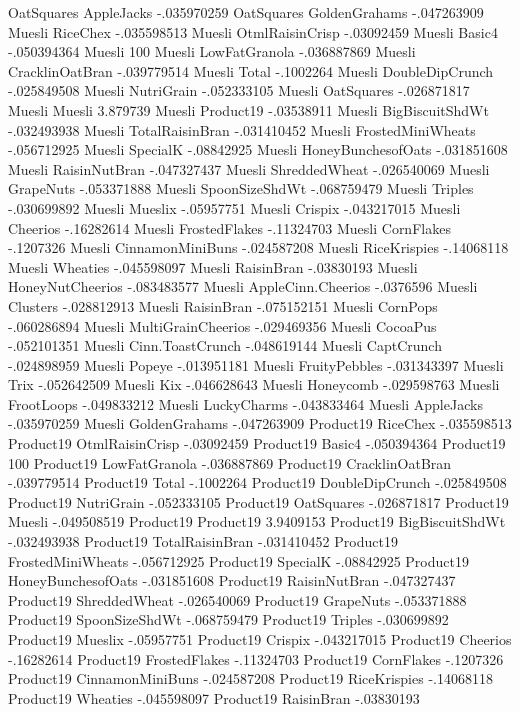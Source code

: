 OatSquares	AppleJacks	-.035970259
OatSquares	GoldenGrahams	-.047263909
Muesli	RiceChex	-.035598513
Muesli	OtmlRaisinCrisp	-.03092459
Muesli	Basic4	-.050394364
Muesli	100%
Muesli	LowFatGranola	-.036887869
Muesli	CracklinOatBran	-.039779514
Muesli	Total	-.1002264
Muesli	DoubleDipCrunch	-.025849508
Muesli	NutriGrain	-.052333105
Muesli	OatSquares	-.026871817
Muesli	Muesli	3.879739
Muesli	Product19	-.03538911
Muesli	BigBiscuitShdWt	-.032493938
Muesli	TotalRaisinBran	-.031410452
Muesli	FrostedMiniWheats	-.056712925
Muesli	SpecialK	-.08842925
Muesli	HoneyBunchesofOats	-.031851608
Muesli	RaisinNutBran	-.047327437
Muesli	ShreddedWheat	-.026540069
Muesli	GrapeNuts	-.053371888
Muesli	SpoonSizeShdWt	-.068759479
Muesli	Triples	-.030699892
Muesli	Mueslix	-.05957751
Muesli	Crispix	-.043217015
Muesli	Cheerios	-.16282614
Muesli	FrostedFlakes	-.11324703
Muesli	CornFlakes	-.1207326
Muesli	CinnamonMiniBuns	-.024587208
Muesli	RiceKrispies	-.14068118
Muesli	Wheaties	-.045598097
Muesli	RaisinBran	-.03830193
Muesli	HoneyNutCheerios	-.083483577
Muesli	AppleCinn.Cheerios	-.0376596
Muesli	Clusters	-.028812913
Muesli	RaisinBran	-.075152151
Muesli	CornPops	-.060286894
Muesli	MultiGrainCheerios	-.029469356
Muesli	CocoaPus	-.052101351
Muesli	Cinn.ToastCrunch	-.048619144
Muesli	CaptCrunch	-.024898959
Muesli	Popeye	-.013951181
Muesli	FruityPebbles	-.031343397
Muesli	Trix	-.052642509
Muesli	Kix	-.046628643
Muesli	Honeycomb	-.029598763
Muesli	FrootLoops	-.049833212
Muesli	LuckyCharms	-.043833464
Muesli	AppleJacks	-.035970259
Muesli	GoldenGrahams	-.047263909
Product19	RiceChex	-.035598513
Product19	OtmlRaisinCrisp	-.03092459
Product19	Basic4	-.050394364
Product19	100%
Product19	LowFatGranola	-.036887869
Product19	CracklinOatBran	-.039779514
Product19	Total	-.1002264
Product19	DoubleDipCrunch	-.025849508
Product19	NutriGrain	-.052333105
Product19	OatSquares	-.026871817
Product19	Muesli	-.049508519
Product19	Product19	3.9409153
Product19	BigBiscuitShdWt	-.032493938
Product19	TotalRaisinBran	-.031410452
Product19	FrostedMiniWheats	-.056712925
Product19	SpecialK	-.08842925
Product19	HoneyBunchesofOats	-.031851608
Product19	RaisinNutBran	-.047327437
Product19	ShreddedWheat	-.026540069
Product19	GrapeNuts	-.053371888
Product19	SpoonSizeShdWt	-.068759479
Product19	Triples	-.030699892
Product19	Mueslix	-.05957751
Product19	Crispix	-.043217015
Product19	Cheerios	-.16282614
Product19	FrostedFlakes	-.11324703
Product19	CornFlakes	-.1207326
Product19	CinnamonMiniBuns	-.024587208
Product19	RiceKrispies	-.14068118
Product19	Wheaties	-.045598097
Product19	RaisinBran	-.03830193
